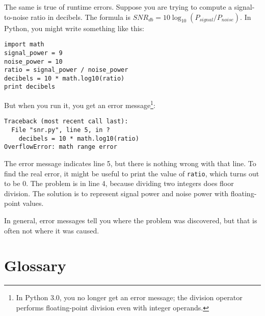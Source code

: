 
The same is true of runtime errors.  Suppose you are trying
to compute a signal-to-noise ratio in decibels.  The formula
is $SNR_{db} = 10 \log_{10} (P_{signal} / P_{noise})$.  In Python,
you might write something like this:

\beforeverb
\begin{verbatim}
import math
signal_power = 9
noise_power = 10
ratio = signal_power / noise_power
decibels = 10 * math.log10(ratio)
print decibels
\end{verbatim}
\afterverb
%
But when you run it, you get an error message\footnote{In Python 3.0,
  you no longer get an error message; the division operator performs
  floating-point division even with integer operands.}:


\beforeverb
\begin{verbatim}
Traceback (most recent call last):
  File "snr.py", line 5, in ?
    decibels = 10 * math.log10(ratio)
OverflowError: math range error
\end{verbatim}
\afterverb
%
The error message indicates line 5, but there is nothing
wrong with that line.  To find the real error, it might be
useful to print the value of {\tt ratio}, which turns out to
be 0.  The problem is in line 4, because dividing two integers
does floor division.  The solution is to represent signal power
and noise power with floating-point values.


In general, error messages tell you where the problem was discovered, 
but that is often not where it was caused.


\section{Glossary}

